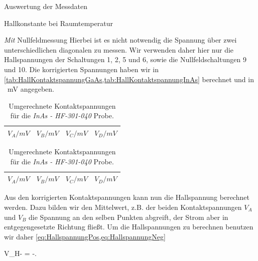 \documentclass[pdftex, a4paper,11pt, twoside, ngerman]{report}
\begin{document}
\begin{chapter}{Auswertung der Messdaten}
\begin{section}{Hallkonstante bei Raumtemperatur}
\begin{subsection}{\textit{Mit} Nullfeldmessung}
        Hierbei ist es nicht notwendig die Spannung über zwei unterschiedlichen
        diagonalen zu messen.
        Wir verwenden daher hier nur die Hallspannungen der Schaltungen
        1, 2, 5 und 6, sowie die Nullfeldschaltungen 9 und 10.
        Die korrigierten Spannungen haben wir in
        \cref{tab:HallKontaktspannungGaAs,tab:HallKontaktspannungInAs} berechnet
        und in \SI{}{\milli\volt} angegeben.
        \begin{table}[htbp]
          \begin{minipage}{.48\textwidth}
            \centering
            \footnotesize
            \begin{tabular}{cccc}
              $V_{A}/mV$ & $V_{B}/mV$ & $V_{C}/mV$ & $V_{D}/mV$ \\ \hline \hline
              
            \end{tabular}
            \caption{Umgerechnete Kontaktspannungen für die
                \textit{GaAs (alt)} Probe.}
            \label{tab:HallKontaktspannungGaAs}
          \end{minipage}\quad
          \begin{minipage}{.48\textwidth}
            \centering
            \footnotesize
            \begin{tabular}{cccc}
              $V_{A}/mV$ & $V_{B}/mV$ & $V_{C}/mV$ & $V_{D}/mV$ \\ \hline \hline
              
            \end{tabular}
            \caption{Umgerechnete Kontaktspannungen für die 
                \textit{InAs - HF-301-040} Probe.}
            \label{tab:HallKontaktspannungInAs}
          \end{minipage}
        \end{table}
        
        Aus den korrigierten Kontaktspannungen kann nun die Hallspannung
        berechnet werden.
        Dazu bilden wir den Mittelwert, z.B. der beiden Kontaktspannungen
        $V_{A}$ und $V_{B}$ die Spannung an den selben Punkten abgreift, der
        Strom aber in entgegengesetzte Richtung fließt.
        Um die Hallspannungen zu berechnen benutzen wir daher
        \cref{eq:HallspannungPos,eq:HallspannungNeg}
        
               {V_{H-} = -. \label{eq:HallspannungNeg}}
        

\end{subsection}
\end{section}
\end{chapter}
\end{document}
